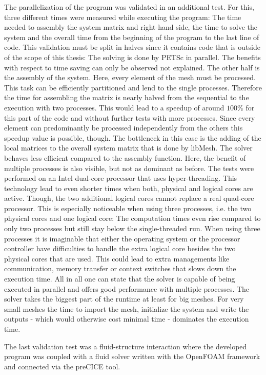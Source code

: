   The parallelization of the program was validated in an additional test. For this, three different times were measured while executing the program: The time needed to assembly the system matrix and right-hand side, the time to solve the system and the overall time from the beginning of the program to the last line of code. This validation must be split in halves since it contains code that is outside of the scope of this thesis: The solving is done by PETSc in parallel. The benefits with respect to time saving can only be observed not explained. The other half is the assembly of the system. Here, every element of the mesh must be processed. This task can be efficiently partitioned and lend to the single processes. Therefore the time for assembling the matrix is nearly halved from the sequential to the execution with two processes. This would lead to a speedup of around $100\%$ for this part of the code and without further tests with more processes. Since every element can predominantly be processed independently from the others this speedup value is possible, though. The bottleneck in this case is the adding of the local matrices to the overall system matrix that is done by libMesh. The solver behaves less efficient compared to the assembly function. Here, the benefit of multiple processes is also visible, but not as dominant as before. The tests were performed on an Intel dual-core processor that uses hyper-threading. This technology lead to even shorter times when both, physical and logical cores are active. Though, the two additional logical cores cannot replace a real quad-core processor. This is especially noticeable when using three processes, i.e. the two physical cores and one logical core: The computation times even rise compared to only two processes but still stay below the single-threaded run. When using three processes it is imaginable that either the operating system or the processor controller have difficulties to handle the extra logical core besides the two physical cores that are used. This could lead to extra managements like communication, memory transfer or context switches that slows down the execution time. All in all one can state that the solver is capable of being executed in parallel and offers good performance with multiple processes. The solver takes the biggest part of the runtime at least for big meshes. For very small meshes the time to import the mesh, initialize the system and write the outputs - which would otherwise cost minimal time - dominates the execution time.
  
  The last validation test was a fluid-structure interaction where the developed program was coupled with a fluid solver written with the OpenFOAM framework and connected via the preCICE tool.
 
